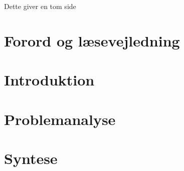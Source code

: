 


\raggedbottom



\frontmatter


\clearpage
\thispagestyle{empty}
{\color{white}Dette giver en tom side}
\clearpage


\chapter*{Forord og læsevejledning}\vspace{-.75cm}

\newpage

\tableofcontents* 

\mainmatter

\chapter{Introduktion}\vspace{-.75cm}

\chapter{Problemanalyse}\vspace{-.75cm}




\cleardoublepage
\chapter{Syntese}\vspace{-.75cm}
%

\begingroup
\label{litteraturliste}
\raggedright


\endgroup
\begin{appendices}
%	
%	
\end{appendices}


